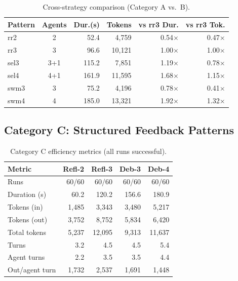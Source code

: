 \documentclass{article}
\begin{document}
\begin{table}[H]
\centering
\caption{Cross-strategy comparison (Category A vs.\ B).}
\label{tab:cross_AB}
{\small
\begin{tabular}{@{}lcrrrr@{}}
\toprule
\textbf{Pattern} & \textbf{Agents} & \textbf{Dur.(s)} & \textbf{Tokens} & \textbf{vs rr3 Dur.} & \textbf{vs rr3 Tok.} \\
\midrule
rr2 & 2 & 52.4 & 4,759 & 0.54$\times$ & 0.47$\times$ \\
rr3 & 3 & 96.6 & 10,121 & 1.00$\times$ & 1.00$\times$ \\
sel3 & 3+1 & 115.2 & 7,851 & 1.19$\times$ & 0.78$\times$ \\
sel4 & 4+1 & 161.9 & 11,595 & 1.68$\times$ & 1.15$\times$ \\
swm3 & 3 & 75.2 & 4,196 & 0.78$\times$ & 0.41$\times$ \\
swm4 & 4 & 185.0 & 13,321 & 1.92$\times$ & 1.32$\times$ \\
\bottomrule
\end{tabular}
}
\end{table}

\subsection{Category C: Structured Feedback Patterns}

\begin{table}[H]
\centering
\caption{Category C efficiency metrics (all runs successful).}
\label{tab:catC}
{\small
\begin{tabular}{@{}lrrrr@{}}
\toprule
\textbf{Metric} & \textbf{Refl-2} & \textbf{Refl-3} & \textbf{Deb-3} & \textbf{Deb-4} \\
\midrule
Runs & 60/60 & 60/60 & 60/60 & 60/60 \\
Duration (s) & 60.2 & 120.2 & 156.6 & 180.9 \\
Tokens (in) & 1,485 & 3,343 & 3,480 & 5,217 \\
Tokens (out) & 3,752 & 8,752 & 5,834 & 6,420 \\
Total tokens & 5,237 & 12,095 & 9,313 & 11,637 \\
Turns & 3.2 & 4.5 & 4.5 & 5.4 \\
Agent turns & 2.2 & 3.5 & 3.5 & 4.4 \\
Out/agent turn & 1,732 & 2,537 & 1,691 & 1,448 \\
\bottomrule
\end{tabular}
}
\end{table}
\end{document}
